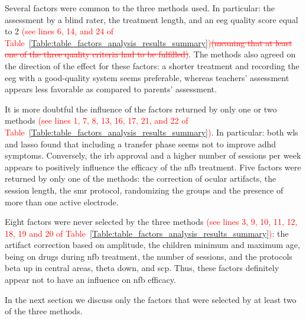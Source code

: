 Several factors were common to the three methods used. In particular: the assessment 
by a blind rater, the treatment length, and an \gls{eeg} quality score equal to 2 \textcolor{red}{(see lines 6, 14, and 24 of 
Table~\ref{Table:table_factors_analysis_results_summary})}\textcolor{red}{\sout{(meaning that at least one of the three quality criteria had to be fulfilled)}}.
The methods also agreed on the direction of the effect for these factors: 
a shorter treatment and recording the \gls{eeg} with a good-quality system seems preferable, whereas teachers' assessment appears less favorable
as compared to parents' assessment.

It is more doubtful the influence of the factors returned by only one or two methods \textcolor{red}{(see lines 1, 7, 8, 13, 16, 17, 21, and 22 
of Table~\ref{Table:table_factors_analysis_results_summary})}. In particular: 
both \gls{wls} and \gls{lasso} found that including a transfer phase seems not to improve \gls{adhd} symptoms. 
Conversely, the \gls{irb} approval and a higher number of sessions per week appears to positively influence the efficacy of the \gls{nfb} treatment. 
Five factors were returned by only one of the methods: the correction of ocular artifacts, the session length, the \gls{smr} protocol, 
randomizing the groups and the presence of more than one active electrode.  

Eight factors were never selected by the three methods \textcolor{red}{(see lines 3, 9, 10, 11, 12, 18, 19 and 20 of 
Table~\ref{Table:table_factors_analysis_results_summary})}: the artifact correction based on amplitude, the children minimum and maximum age, 
being on drugs during \gls{nfb} treatment, the number of sessions, and the protocols beta up in central areas, theta down, and \gls{scp}. 
Thus, these factors definitely appear not to have an influence on \gls{nfb} efficacy.  

In the next section we discuss only the factors that were selected by at least two of the three methods. 

